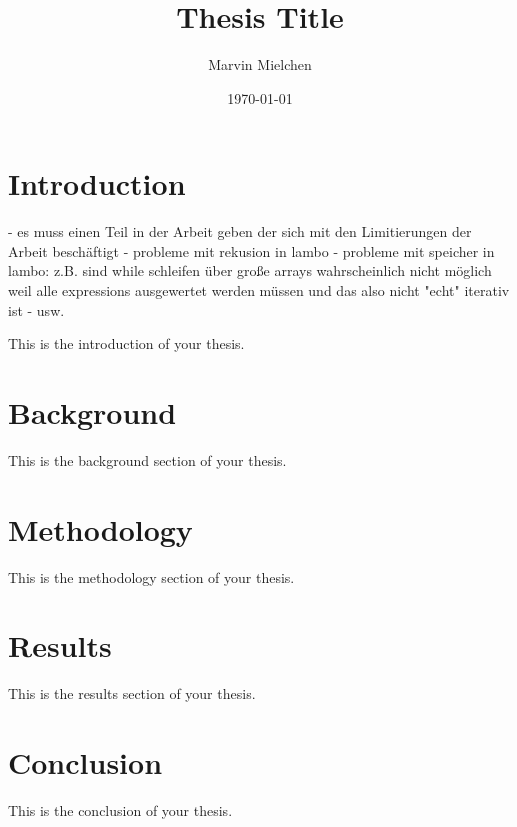 \documentclass{report}
\title{Thesis Title}
\author{Marvin Mielchen}
\date{\today}
\begin{document}
\maketitle

\chapter{Introduction}



- es muss einen Teil in der Arbeit geben der sich mit den Limitierungen der Arbeit beschäftigt
    - probleme mit rekusion in lambo
    - probleme mit speicher in lambo: z.B. sind while schleifen über große arrays wahrscheinlich nicht möglich weil alle expressions ausgewertet werden müssen und
    das also nicht "echt" iterativ ist
    - usw.

    
This is the introduction of your thesis.

\chapter{Background}
This is the background section of your thesis.

\chapter{Methodology}
This is the methodology section of your thesis.

\chapter{Results}
This is the results section of your thesis.

\chapter{Conclusion}
This is the conclusion of your thesis.
\cite{dao}

\printbibliography
\end{document}
